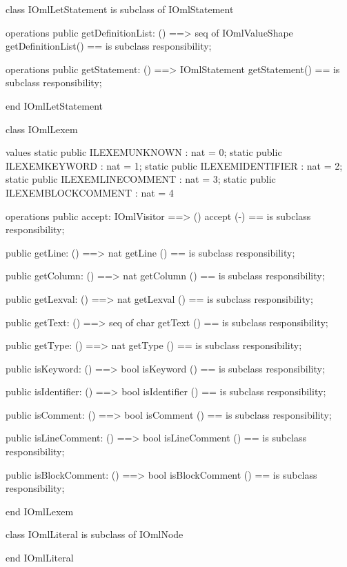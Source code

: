 \begin{vdm_al}
class IOmlLetStatement
 is subclass of IOmlStatement

operations
  public getDefinitionList: () ==> seq of IOmlValueShape
  getDefinitionList() == is subclass responsibility;

operations
  public getStatement: () ==> IOmlStatement
  getStatement() == is subclass responsibility;

end IOmlLetStatement
\end{vdm_al}

\begin{vdm_al}
class IOmlLexem

values
  static public ILEXEMUNKNOWN      : nat = 0;
  static public ILEXEMKEYWORD      : nat = 1;
  static public ILEXEMIDENTIFIER   : nat = 2;
  static public ILEXEMLINECOMMENT  : nat = 3;
  static public ILEXEMBLOCKCOMMENT : nat = 4

operations
  public accept: IOmlVisitor ==> ()
  accept (-) == is subclass responsibility;

  public getLine: () ==> nat
  getLine () == is subclass responsibility;

  public getColumn: () ==> nat
  getColumn () == is subclass responsibility;

  public getLexval: () ==> nat
  getLexval () == is subclass responsibility;

  public getText: () ==> seq of char
  getText () == is subclass responsibility;

  public getType: () ==> nat
  getType () == is subclass responsibility;

  public isKeyword: () ==> bool
  isKeyword () == is subclass responsibility;

  public isIdentifier: () ==> bool
  isIdentifier () == is subclass responsibility;

  public isComment: () ==> bool
  isComment () == is subclass responsibility;

  public isLineComment: () ==> bool
  isLineComment () == is subclass responsibility;

  public isBlockComment: () ==> bool
  isBlockComment () == is subclass responsibility;

end IOmlLexem
\end{vdm_al}
\begin{vdm_al}
class IOmlLiteral
 is subclass of IOmlNode

end IOmlLiteral
\end{vdm_al}

